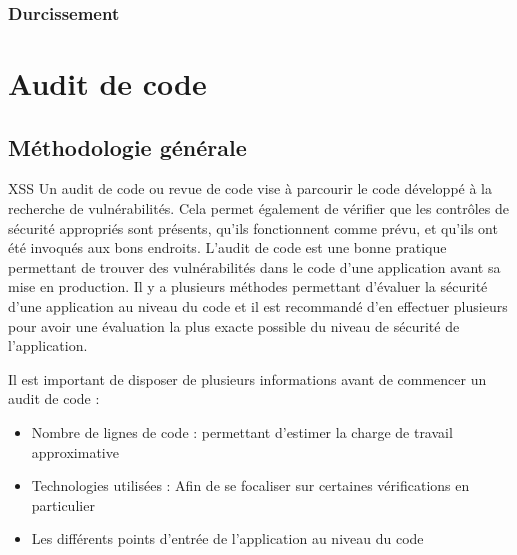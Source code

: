 \documentclass[twoside,a4paper,12pt,titlepage]{book}
\begin{document}
\subsection{Durcissement}

\chapter{Audit de code}
\section{Méthodologie générale}

\begin{Define}{XSS}
Un audit de code ou revue de code vise à parcourir le code développé à la recherche de vulnérabilités. Cela permet également de vérifier que les contrôles de sécurité appropriés
sont présents, qu'ils fonctionnent comme prévu, et qu'ils ont été invoqués aux bons endroits.
L’audit de code est une bonne pratique permettant de trouver des vulnérabilités dans le code d’une application avant sa mise en production. Il y a plusieurs méthodes permettant d’évaluer la sécurité d’une application au niveau du code et il est recommandé d’en effectuer plusieurs pour avoir une évaluation la plus exacte possible du niveau de sécurité de l’application.
\end{Define}
\begin{Pre}
Il est important de disposer de plusieurs informations avant de commencer un audit de code :\begin{itemize}
\item Nombre de lignes de code : permettant d’estimer la charge de travail approximative
\item Technologies utilisées : Afin de se focaliser sur certaines vérifications en particulier
\item Les différents points d’entrée de l’application au niveau du code
\end{itemize}
\end{Pre}
\end{document}
